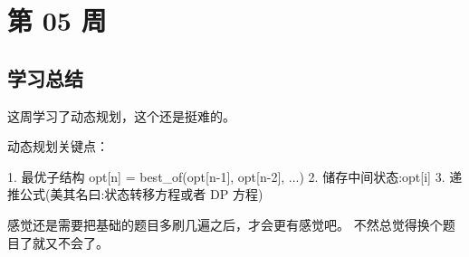 \newpage
\section{第 05 周}



\subsection{学习总结}

这周学习了动态规划，这个还是挺难的。

动态规划关键点：

1. 最优子结构 opt[n] = best\_of(opt[n-1], opt[n-2], ...)
2. 储存中间状态:opt[i]
3. 递推公式(美其名曰:状态转移方程或者 DP 方程)

感觉还是需要把基础的题目多刷几遍之后，才会更有感觉吧。
不然总觉得换个题目了就又不会了。
